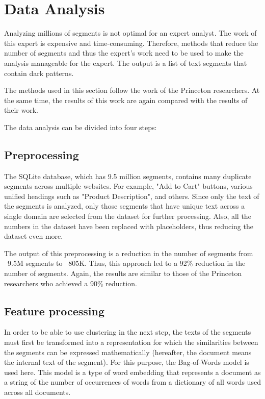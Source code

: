 \chapter{Data Analysis}
    Analyzing millions of segments is not optimal for an expert analyst. The work of this expert is expensive and time-consuming. Therefore, methods that reduce the number of segments and thus the expert's work need to be used to make the analysis manageable for the expert. The output is a list of text segments that contain dark patterns.

    The methods used in this section follow the work of the Princeton researchers. At the same time, the results of this work are again compared with the results of their work.

    The data analysis can be divided into four steps:

    \section{Preprocessing}
        The SQLite database, which has 9.5 million segments, contains many duplicate segments across multiple websites. For example, "Add to Cart" buttons, various unified headings such as "Product Description", and others. Since only the text of the segments is analyzed, only those segments that have unique text across a single domain are selected from the dataset for further processing. Also, all the numbers in the dataset have been replaced with placeholders, thus reducing the dataset even more. 

        The output of this preprocessing is a reduction in the number of segments from ~9.5M segments to ~805K. Thus, this approach led to a 92\% reduction in the number of segments. Again, the results are similar to those of the Princeton researchers who achieved a 90\% reduction.

    \section{Feature processing}
        In order to be able to use clustering in the next step, the texts of the segments must first be transformed into a representation for which the similarities between the segments can be expressed mathematically (hereafter, the document means the internal text of the segment).  For this purpose, the Bag-of-Words model is used here. This model is a type of word embedding that represents a document as a string of the number of occurrences of words from a dictionary of all words used across all documents. 

